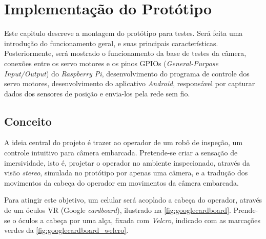 
\chapter{Implementação do Protótipo}
\label{chap:prototipo}

Este capitulo descreve a montagem do protótipo para testes. Será feita uma introdução do funcionamento geral, e suas principais características. Posteriormente, será mostrado o funcionamento da base de testes da câmera, conexões entre os servo motores e os pinos GPIOs (\textit{General-Purpose Input/Output}) do \textit{Raspberry Pi}, desenvolvimento do programa de controle dos servo motores, desenvolvimento do aplicativo \textit{Android}, responsável por capturar dados dos sensores de posição e envia-los pela rede sem fio.

\section{Conceito}
\label{sec:conceito}

A ideia central do projeto é trazer ao operador de um robô de inspeção, um controle intuitivo para câmera embarcada. Pretende-se criar a sensação de imersividade, isto é, projetar o operador no ambiente inspecionado, através da visão \textit{stereo}, simulada no protótipo por apenas uma câmera, e a tradução dos movimentos da cabeça do operador em movimentos da câmera embarcada.\par
Para atingir este objetivo, um celular será acoplado a cabeça do operador, através de um óculos VR (Google \textit{cardboard}), ilustrado na \autoref{fig:googlecardboard}. Prende-se o óculos a cabeça por uma alça, fixada com \textit{Velcro}, indicado com as marcações verdes da \autoref{fig:googlecardboard_welcro}. \par 

